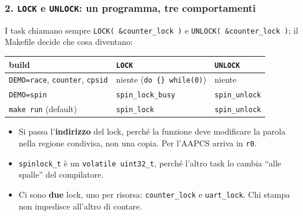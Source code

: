 \subsubsection*{2. \texttt{LOCK} e \texttt{UNLOCK}: un programma, tre comportamenti}
I task chiamano sempre \texttt{LOCK( \&counter\_lock )} e \texttt{UNLOCK( \&counter\_lock )}; il Makefile decide che cosa diventano:
\begin{center}
\small
\begin{tabular}{P{0.4} P{0.27} P{0.23}}
    \hline
    \textbf{build} & \texttt{LOCK} & \texttt{UNLOCK} \\
    \hline
    \texttt{DEMO=race}, \texttt{counter}, \texttt{cpsid} & niente (\texttt{do \{\} while(0)}) & niente \\
    \texttt{DEMO=spin} & \texttt{spin\_lock\_busy} & \texttt{spin\_unlock} \\
    \texttt{make run} (default) & \texttt{spin\_lock} & \texttt{spin\_unlock} \\
    \hline
\end{tabular}
\end{center}
\begin{itemize}
    \item Si passa l'\textbf{indirizzo} del lock, perché la funzione deve modificare la parola nella regione condivisa, non una copia. Per l'AAPCS arriva in \texttt{r0}.
    \item \texttt{spinlock\_t} è un \texttt{volatile uint32\_t}, perché l'altro task lo cambia ``alle spalle'' del compilatore.
    \item Ci sono \textbf{due} lock, uno per risorsa: \texttt{counter\_lock} e \texttt{uart\_lock}. Chi stampa non impedisce all'altro di contare.
\end{itemize}

